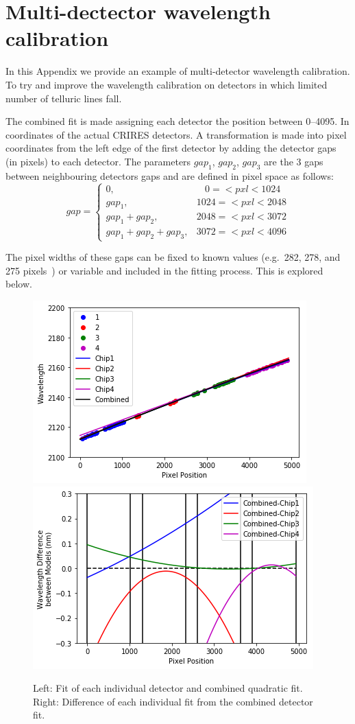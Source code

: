 
\chapter{Multi-dectector wavelength calibration} %
\label{appendix:wavelength_fitting}

In this Appendix we provide an example of multi-detector wavelength calibration.
To try and improve the wavelength calibration on detectors in which limited number of telluric lines fall.


The combined fit is made assigning each detector the position between 0--4095.
In coordinates of the actual {CRIRES} detectors.
A transformation is made into pixel coordinates from the left edge of the first detector by adding the detector gaps (in pixels) to each detector.
The parameters \(gap_{1}\), \(gap_{2}\), \(gap_{3}\) are the 3 gaps between neighbouring detectors gaps and are defined in pixel space as follows:
\[
gap =\begin{cases}
0,                       & ~~~~0=<pxl<1024\\
gap_1,                    & 1024=<pxl<2048\\
gap_1 + gap_2,             & 2048=<pxl<3072\\
gap_1 + gap_2 + gap_3,      & 3072=<pxl<4096
\end{cases}
\]

The pixel widths of these gaps can be fixed to known values (e.g.\ 282, 278, and 275 pixels~\citep{brogi_rotation_2016}) or variable and included in the fitting process.
This is explored below.




\begin{figure}
    \centering
    \includegraphics[width=0.45\linewidth]{./figures/appendix/multi_detector_fit}
    \includegraphics[width=0.45\linewidth]{./figures/appendix/multidector_fit_diff}
    \caption[Multi-detector fit and difference to individual fits.]{Left: Fit of each individual detector and combined quadratic fit.
Right: Difference of each individual fit from the combined detector fit.}
    \label{fig:multidectorfitdiff}
\end{figure}


